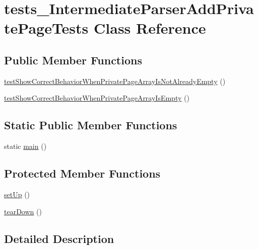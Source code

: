 \hypertarget{classtests___intermediate_parser_add_private_page_tests}{\section{tests\-\_\-\-Intermediate\-Parser\-Add\-Private\-Page\-Tests \-Class \-Reference}
\label{classtests___intermediate_parser_add_private_page_tests}
}
\subsection*{\-Public \-Member \-Functions}
\begin{DoxyCompactItemize}
\item 
\hyperlink{classtests___intermediate_parser_add_private_page_tests_ad7067a2d7c3e25584c00856a4019fad1}{test\-Show\-Correct\-Behavior\-When\-Private\-Page\-Array\-Is\-Not\-Already\-Empty} ()
\item 
\hyperlink{classtests___intermediate_parser_add_private_page_tests_a9e65bc22524f7af4c94d601eb0f91453}{test\-Show\-Correct\-Behavior\-When\-Private\-Page\-Array\-Is\-Empty} ()
\end{DoxyCompactItemize}
\subsection*{\-Static \-Public \-Member \-Functions}
\begin{DoxyCompactItemize}
\item 
static \hyperlink{classtests___intermediate_parser_add_private_page_tests_a36f43c36e6b3288e6bfb8244ce59073e}{main} ()
\end{DoxyCompactItemize}
\subsection*{\-Protected \-Member \-Functions}
\begin{DoxyCompactItemize}
\item 
\hyperlink{classtests___intermediate_parser_add_private_page_tests_a0bc688732d2b3b162ffebaf7812e78da}{set\-Up} ()
\item 
\hyperlink{classtests___intermediate_parser_add_private_page_tests_a80fe3d17e658907fc75346a0ec9d6fc7}{tear\-Down} ()
\end{DoxyCompactItemize}


\subsection{\-Detailed \-Description}



